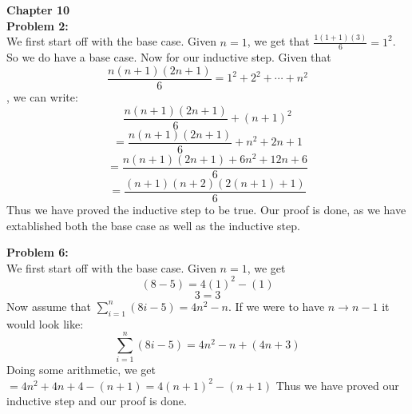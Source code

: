 \documentclass[12pt]{article}
\begin{document}
\noindent 
\textbf{Chapter 10}\\

\noindent
\textbf{Problem 2:}\\
We first start off with the base case. Given $n = 1$, we get that $\frac{1(1+1)(3)}{6} = 1^2$. So we do have a base case.
Now for our inductive step. Given that $$\frac{n(n+1)(2n+1)}{6} = 1^2 + 2^2 + \cdots + n^2$$,
we can write:
$$\frac{n(n+1)(2n+1)}{6} + (n+1)^2$$
$$= \frac{n(n+1)(2n+1)}{6} + n^2+2n+1$$
$$= \frac{n(n+1)(2n+1)+6n^2+12n+6}{6}$$
$$= \frac{(n+1)(n+2)(2(n+1)+1)}{6}$$
Thus we have proved the inductive step to be true. Our proof is done, as we have extablished both 
the base case as well as the inductive step.

\noindent
\textbf{Problem 6:}\\
We first start off with the base case. Given $n = 1$, we get
$$(8-5) = 4(1)^2-(1)$$
$$3 = 3$$
Now assume that $\sum^{n}_{i = 1}(8i-5) = 4n^2 - n$. If we were to have $n \rightarrow n-1$ it would look like:
$$\sum^{n}_{i = 1}(8i-5) = 4n^2 - n + (4n + 3)$$
Doing some arithmetic, we get
$= 4n^2 +4n + 4 - (n+1) = 4(n+1)^2 - (n+1)$
Thus we have proved our inductive step and our proof is done.
\end{document}
